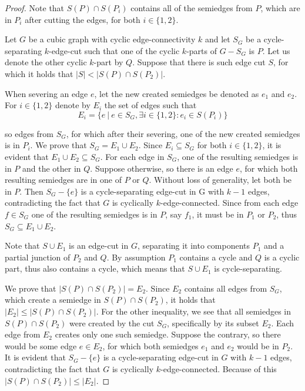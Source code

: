 \begin{proof}
	Note that $S(P)\cap S(P_i)$ contains all of the semiedges from $P$, which are in $P_i$ after cutting the edges, for both $i\in\{1,2\}$.
	
	Let $G$ be a cubic graph with cyclic edge-connectivity $k$ and let $S_G$ be a cycle-separating $k$-edge-cut such that one of the cyclic $k$-parts of $G-S_G$ is $P$. Let us denote the other cyclic $k$-part by $Q$. Suppose that there is such edge cut $S$, for which it holds that $|S| < |S(P)\cap S(P_2)|$. 
	
	When severing an edge $e$, let the new created semiedges be denoted as $e_1$ and $e_2$. For $i\in\{1,2\}$ denote by $E_i$ the set of edges such that $$E_i=\{e ~|~ e\in S_G, \exists i \in \{1,2\}: e_i\in S(P_i)\}$$
	
	so edges from $S_G$, for which after their severing, one of the new created semiedges is in $P_i$. We prove that $S_G=E_1\cup E_2$. Since $E_i\subseteq S_G$ for both $i\in\{1,2\}$, it is evident that $E_1\cup E_2\subseteq S_G$. For each edge in $S_G$, one of the resulting semiedges is in $P$ and the other in $Q$. Suppose otherwise, so there is an edge $e$, for which both resulting semiedges are in one of $P$ or $Q$. Without loss of generality, let both be in $P$. Then $S_G-\{e\}$ is a cycle-separating edge-cut in G with $k-1$ edges, contradicting the fact that $G$ is cyclically $k$-edge-connected. Since from each edge $f\in S_G$ one of the resulting semiedges is in $P$, say $f_1$, it must be in $P_1$ or $P_2$, thus $S_G\subseteq E_1\cup E_2$.
	
	Note that $S\cup E_1$ is an edge-cut in $G$, separating it into components $P_1$ and a partial junction of $P_2$ and $Q$. By assumption $P_1$ contains a cycle and $Q$ is a cyclic part, thus also contains a cycle, which means that $S\cup E_1$ is cycle-separating.
	
	We prove that $|S(P)\cap S(P_2)|=E_2$. Since $E_2$ contains all edges from $S_G$, which create a semiedge in $S(P)\cap S(P_2)$, it holds that $|E_2|\leq |S(P)\cap S(P_2)|$. For the other inequality, we see that all semiedges in $S(P)\cap S(P_2)$ were created by the cut $S_G$, specifically by its subset $E_2$. Each edge from $E_2$ creates only one such semiedge. Suppose the contrary, so there would be some edge $e\in E_2$, for which both semiedges $e_1$ and $e_2$ would be in $P_2$. It is evident that $S_G-\{e\}$ is a cycle-separating edge-cut in $G$ with $k-1$ edges, contradicting the fact that $G$ is cyclically $k$-edge-connected. Because of this $|S(P)\cap S(P_2)|\leq |E_2|$. 
	

\end{proof}
